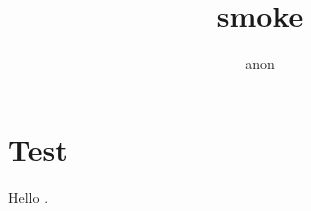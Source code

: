 \documentclass[times,10pt,twocolumn]{article}
\begin{document}
\title{smoke}\author{anon}\maketitle
\section{Test}Hello \cite{zhang2020fgsc23}.


\end{document}
